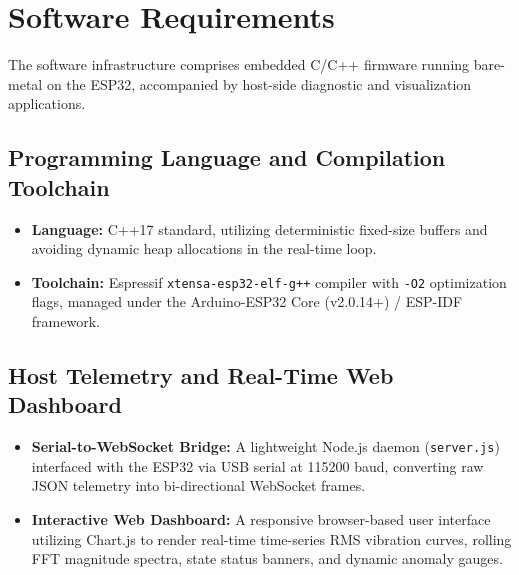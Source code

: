 \section{Software Requirements}
\hspace{2em}The software infrastructure comprises embedded C/C++ firmware running bare-metal on the ESP32, accompanied by host-side diagnostic and visualization applications.

\subsection{Programming Language and Compilation Toolchain}
\begin{itemize}
    \item \textbf{Language:} C++17 standard, utilizing deterministic fixed-size buffers and avoiding dynamic heap allocations in the real-time loop.
    \item \textbf{Toolchain:} Espressif \texttt{xtensa-esp32-elf-g++} compiler with \texttt{-O2} optimization flags, managed under the Arduino-ESP32 Core (v2.0.14+) / ESP-IDF framework.
\end{itemize}

\subsection{Host Telemetry and Real-Time Web Dashboard}
\begin{itemize}
    \item \textbf{Serial-to-WebSocket Bridge:} A lightweight Node.js daemon (\texttt{server.js}) interfaced with the ESP32 via USB serial at 115200 baud, converting raw JSON telemetry into bi-directional WebSocket frames.
    \item \textbf{Interactive Web Dashboard:} A responsive browser-based user interface utilizing Chart.js to render real-time time-series RMS vibration curves, rolling FFT magnitude spectra, state status banners, and dynamic anomaly gauges.
\end{itemize}

